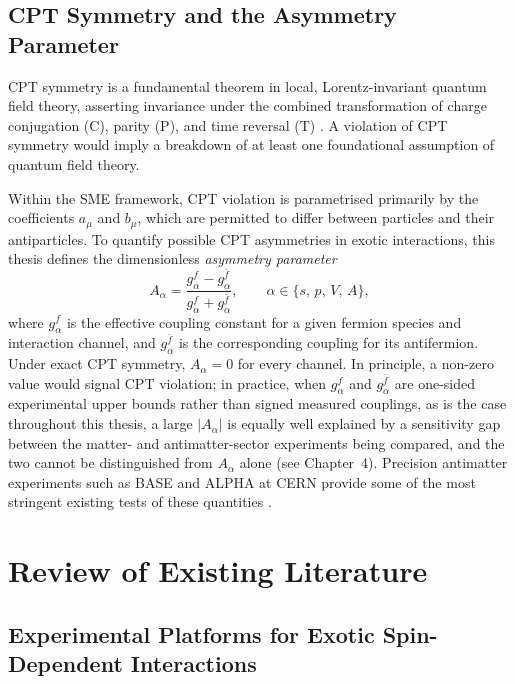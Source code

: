 \documentclass[main]{subfiles}
\begin{document}
\subsection{CPT Symmetry and the Asymmetry Parameter}

CPT symmetry is a fundamental theorem in local, Lorentz-invariant quantum field
theory, asserting invariance under the combined transformation of charge
conjugation (C), parity (P), and time reversal (T) \cite{Colladay1997}. A
violation of CPT symmetry would imply a breakdown of at least one foundational
assumption of quantum field theory.

Within the SME framework, CPT violation is parametrised primarily by the
coefficients $a_{\mu}$ and $b_{\mu}$, which are permitted to differ between
particles and their antiparticles. To quantify possible CPT asymmetries in
exotic interactions, this thesis defines the dimensionless \emph{asymmetry
parameter}
\begin{equation}
  A_{\alpha}
  = \frac{g_{\alpha}^{f} - g_{\alpha}^{\bar{f}}}
         {g_{\alpha}^{f} + g_{\alpha}^{\bar{f}}},
  \qquad \alpha\in\{s,\,p,\,V,\,A\},
\end{equation}
where $g_{\alpha}^{f}$ is the effective coupling constant for a given fermion
species and interaction channel, and $g_{\alpha}^{\bar{f}}$ is the
corresponding coupling for its antifermion. Under exact CPT symmetry, $A_{\alpha}
= 0$ for every channel. In principle, a non-zero value would signal CPT
violation; in practice, when $g_{\alpha}^{f}$ and $g_{\alpha}^{\bar{f}}$ are
one-sided experimental upper bounds rather than signed measured couplings,
as is the case throughout this thesis, a large $|A_{\alpha}|$ is equally
well explained by a sensitivity gap between the matter- and antimatter-sector
experiments being compared, and the two cannot be distinguished from
$A_{\alpha}$ alone (see Chapter~4). Precision antimatter experiments such as
BASE and ALPHA at CERN provide some of the most stringent existing tests of
these quantities \cite{Smorra2017,Ahmadi2017}.

\section{Review of Existing Literature}

\subsection{Experimental Platforms for Exotic Spin-Dependent Interactions}
\end{document}
